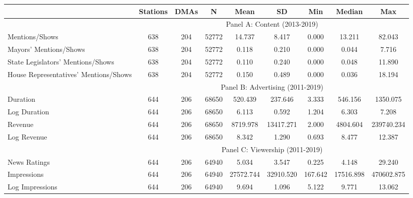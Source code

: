{\def \sym#1{\ifmmode^{#1}\else\(^{#1}\)\fi} \begin{tabular}{l*{8}{c}} \toprule
                    &    Stations&        DMAs&           N&        Mean&          SD&         Min&      Median&         Max\\
\midrule \ & \multicolumn{8}{c}{Panel A: Content (2013-2019)} \\\cmidrule(lr){2-9}
Mentions/Shows      &         638&         204&       52772&      14.737&       8.417&       0.000&      13.211&      82.043\\
Mayors' Mentions/Shows&         638&         204&       52772&       0.118&       0.210&       0.000&       0.044&       7.716\\
State Legislators' Mentions/Shows&         638&         204&       52772&       0.110&       0.240&       0.000&       0.048&      11.890\\
House Representatives' Mentions/Shows&         638&         204&       52772&       0.150&       0.489&       0.000&       0.036&      18.194\\
\midrule \ & \multicolumn{8}{c}{Panel B: Advertising (2011-2019)} \\\cmidrule(lr){2-9}
Duration            &         644&         206&       68650&     520.439&     237.646&       3.333&     546.156&    1350.075\\
Log Duration        &         644&         206&       68650&       6.113&       0.592&       1.204&       6.303&       7.208\\
Revenue             &         644&         206&       68650&    8719.978&   13417.271&       2.000&    4804.604&  239740.234\\
Log Revenue         &         644&         206&       68650&       8.342&       1.290&       0.693&       8.477&      12.387\\
\midrule \ & \multicolumn{8}{c}{Panel C: Viewership (2011-2019)} \\\cmidrule(lr){2-9}
News Ratings        &         644&         206&       64940&       5.034&       3.547&       0.225&       4.148&      29.240\\
Impressions         &         644&         206&       64940&   27572.744&   32910.520&     167.642&   17516.898&  470602.875\\
Log Impressions     &         644&         206&       64940&       9.694&       1.096&       5.122&       9.771&      13.062\\
\bottomrule \end{tabular}}
